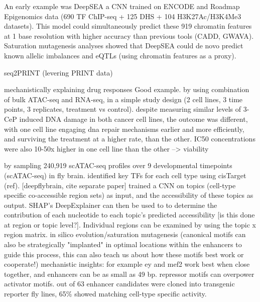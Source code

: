 An early example was DeepSEA a CNN trained on ENCODE and Roadmap Epigenomics data (690 TF ChIP-seq + 125 DHS + 104 H3K27Ac/H3K4Me3 datasets). This model could simultaneously predict these 919 chromatin features at 1 base resolution with higher accuracy than previous tools (CADD, GWAVA). Saturation mutagenesis analyses showed that DeepSEA could de novo predict known allelic imbalances and eQTLs (using chromatin features as a proxy).

seq2PRINT (levering PRINT data)

mechanistically explaining drug responses Good example. by using combination of bulk ATAC-seq and RNA-seq, in a simple study design (2 cell lines, 3 time points, 3 replicates, treatment vs control). despite measuring similar levels of 3-CeP induced DNA damage in both cancer cell lines, the outcome was different, with one cell line engaging dna repair mechanisms earlier and more efficiently, and surviving the treatment at a higher rate, than the other. IC50 concentrations were also 10-50x higher in one cell line than the other --> viability

 by sampling 240,919 scATAC-seq profiles over 9 developmental timepoints (scATAC-seq) in fly brain. identified key TFs for each cell type using cisTarget (ref). [deepflybrain, cite separate paper] trained a CNN on topics (cell-type specific co-accessible region sets) as input, and the accessibility of these topics as output. SHAP's DeepExplainer can then be used to to determine the contribution of each nucleotide to each topic's predicted accessibility [is this done at region or topic level?]. Individual regions can be examined by using the topic x region matrix. in silico evolution/saturation mutagenesis (canonical motifs can also be strategically "implanted" in optimal locations within the enhancers to guide this process, this can also teach us about how these motifs best work or cooperate!) mechanistic insights: for example ey and mef2 work best when close together, and enhancers can be as small as 49 bp. repressor motifs can overpower activator motifs. out of 63 enhancer candidates were cloned into transgenic reporter fly lines, 65\% showed matching cell-type specific activity.

